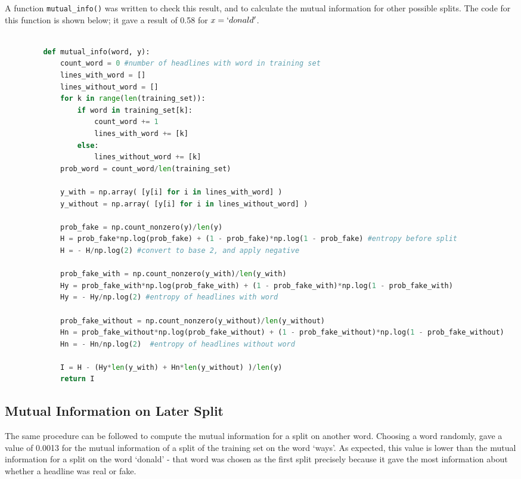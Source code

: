 \documentclass{article}
\begin{document}
   A function \texttt{mutual\_info()} was written to check this result, and to calculate the mutual
   information for other possible splits. The code for this function is shown below; it gave a result
   of 0.58 for $x = `donald'$.

      \begin{lstlisting}[language=Python]

         def mutual_info(word, y):
             count_word = 0 #number of headlines with word in training set
             lines_with_word = []
             lines_without_word = []
             for k in range(len(training_set)):
                 if word in training_set[k]:
                     count_word += 1
                     lines_with_word += [k]
                 else:
                     lines_without_word += [k]
             prob_word = count_word/len(training_set)

             y_with = np.array( [y[i] for i in lines_with_word] )
             y_without = np.array( [y[i] for i in lines_without_word] )

             prob_fake = np.count_nonzero(y)/len(y)
             H = prob_fake*np.log(prob_fake) + (1 - prob_fake)*np.log(1 - prob_fake) #entropy before split
             H = - H/np.log(2) #convert to base 2, and apply negative

             prob_fake_with = np.count_nonzero(y_with)/len(y_with)
             Hy = prob_fake_with*np.log(prob_fake_with) + (1 - prob_fake_with)*np.log(1 - prob_fake_with)
             Hy = - Hy/np.log(2) #entropy of headlines with word

             prob_fake_without = np.count_nonzero(y_without)/len(y_without)
             Hn = prob_fake_without*np.log(prob_fake_without) + (1 - prob_fake_without)*np.log(1 - prob_fake_without)
             Hn = - Hn/np.log(2)  #entropy of headlines without word

             I = H - (Hy*len(y_with) + Hn*len(y_without) )/len(y)
             return I
      \end{lstlisting}



   \subsection{Mutual Information on Later Split}
   The same procedure can be followed to compute the mutual information for a split on another word.
   Choosing a word randomly, gave a value of 0.0013 for the mutual information of a split of the training
   set on the word `ways'. As expected, this value is lower than the mutual information for a split on the
   word `donald' - that word was chosen as the first split precisely because it gave the most information
   about whether a headline was real or fake.
\end{document}
